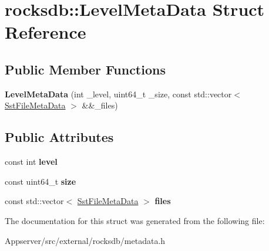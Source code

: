 \hypertarget{structrocksdb_1_1LevelMetaData}{}\section{rocksdb\+:\+:Level\+Meta\+Data Struct Reference}
\label{structrocksdb_1_1LevelMetaData}
\subsection*{Public Member Functions}
\begin{DoxyCompactItemize}
\item 
{\bfseries Level\+Meta\+Data} (int \+\_\+level, uint64\+\_\+t \+\_\+size, const std\+::vector$<$ \hyperlink{structrocksdb_1_1SstFileMetaData}{Sst\+File\+Meta\+Data} $>$ \&\&\+\_\+files)\hypertarget{structrocksdb_1_1LevelMetaData_aa76b1ae21d24c6ecdc941809a2486d38}{}\label{structrocksdb_1_1LevelMetaData_aa76b1ae21d24c6ecdc941809a2486d38}

\end{DoxyCompactItemize}
\subsection*{Public Attributes}
\begin{DoxyCompactItemize}
\item 
const int {\bfseries level}\hypertarget{structrocksdb_1_1LevelMetaData_a7e937239c43763851507c13c79275a63}{}\label{structrocksdb_1_1LevelMetaData_a7e937239c43763851507c13c79275a63}

\item 
const uint64\+\_\+t {\bfseries size}\hypertarget{structrocksdb_1_1LevelMetaData_a79efd06d2b73900b508e248fe0633e26}{}\label{structrocksdb_1_1LevelMetaData_a79efd06d2b73900b508e248fe0633e26}

\item 
const std\+::vector$<$ \hyperlink{structrocksdb_1_1SstFileMetaData}{Sst\+File\+Meta\+Data} $>$ {\bfseries files}\hypertarget{structrocksdb_1_1LevelMetaData_a16a5833f8818bc0868709be0ada41381}{}\label{structrocksdb_1_1LevelMetaData_a16a5833f8818bc0868709be0ada41381}

\end{DoxyCompactItemize}


The documentation for this struct was generated from the following file\+:\begin{DoxyCompactItemize}
\item 
Appserver/src/external/rocksdb/metadata.\+h\end{DoxyCompactItemize}
